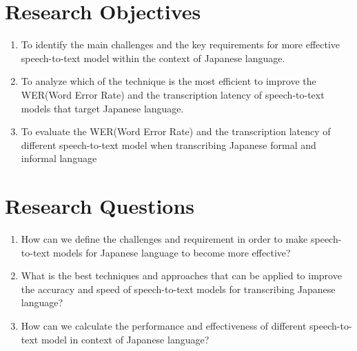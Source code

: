 





\section{Research Objectives}
\begin{enumerate}
    \item To identify the main challenges and the key requirements for more effective speech-to-text model within the context of Japanese language.
    
    \item To analyze which of the technique is the most efficient to improve the WER(Word Error Rate) and the transcription latency of speech-to-text models that target Japanese language.

    \item To evaluate the WER(Word Error Rate) and the transcription latency of different speech-to-text model when transcribing Japanese formal and informal language
\end{enumerate}

\section{Research Questions}
\begin{enumerate}
    \item How can we define the challenges and requirement in order to make speech-to-text models for Japanese language to become more effective?
    
    \item What is the best techniques and approaches that can be applied to improve the accuracy and speed of speech-to-text models for transcribing Japanese language?

    \item How can we calculate the performance and effectiveness of different speech-to-text model in context of Japanese language?
\end{enumerate}



